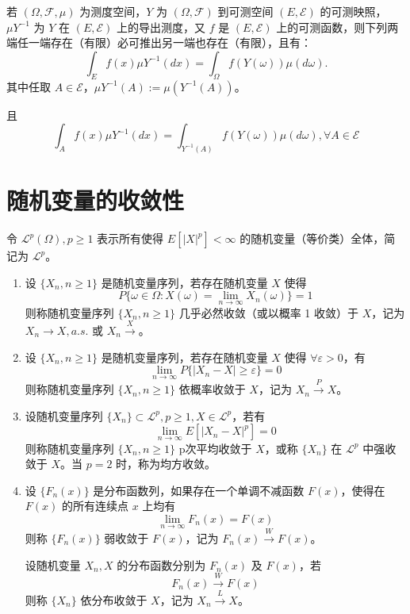 \documentclass[lang=cn,10pt,thmcnt=section]{elegantbook}
\begin{document}
\begin{theorem}[变量代换]
	若 \((\Omega, \mathscr{F}, \mu)\) 为测度空间，\(Y\) 为 \((\Omega, \mathscr{F})\) 到可测空间 \((E, \mathscr{E})\) 的可测映照，\(\mu Y^{-1}\) 为 \(Y\) 在 \((E, \mathscr{E})\) 上的导出测度，又 \(f\) 是 \((E, \mathscr{E})\) 上的可测函数，则下列两端任一端存在（有限）必可推出另一端也存在（有限），且有：
\[
\int_E f(x) \mu Y^{-1}(dx) = \int_\Omega f(Y(\omega)) \mu(d\omega). \tag{1.2.4}
\]
其中任取 \(A \in \mathscr{E}\)，\(\mu Y^{-1}(A) := \mu(Y^{-1}(A))\)。

且
\[
\int_A f(x) \mu Y^{-1}(dx) = \int_{Y^{-1}(A)} f(Y(\omega)) \mu(d\omega), \forall A \in \mathscr{E} \tag{1.2.5}
\]
\end{theorem}
\section{随机变量的收敛性}
令 \(\mathcal{L}^p(\Omega), p \geq 1\) 表示所有使得 \(E[|X|^p] < \infty\) 的随机变量（等价类）全体，简记为 \(\mathcal{L}^p\)。
\begin{definition}
	\begin{enumerate}
		\item 设 \(\{X_n, n \geq 1\}\) 是随机变量序列，若存在随机变量 \(X\) 使得
		\[
		P\{\omega \in \Omega : X(\omega) = \lim_{n \to \infty} X_n(\omega)\} = 1
		\]
		则称随机变量序列 \(\{X_n, n \geq 1\}\) 几乎必然收敛（或以概率 1 收敛）于 \(X\)，记为 \(X_n \rightarrow X, a.s.\) 或 \(X_n \xrightarrow X\)。
		\item 设 \(\{X_n, n \geq 1\}\) 是随机变量序列，若存在随机变量 \(X\) 使得 \(\forall \varepsilon > 0\)，有
		\[
		\lim_{n \to \infty} P\{|X_n - X| \geq \varepsilon\} = 0
		\]
		则称随机变量序列 \(\{X_n, n \geq 1\}\) 依概率收敛于 \(X\)，记为 \(X_n \overset{P}{\rightarrow} X\)。
		\item 设随机变量序列 \(\{X_n\} \subset \mathcal{L}^p, p \geq 1, X \in \mathcal{L}^p\)，若有
		\[
		\lim_{n \to \infty} E[|X_n - X|^p] = 0
		\]
		则称随机变量序列 \(\{X_n, n \geq 1\}\) p次平均收敛于 \(X\)，或称 \(\{X_n\}\) 在 \(\mathcal{L}^p\) 中强收敛于 \(X\)。当 \(p = 2\) 时，称为均方收敛。
		\item 设 \(\{F_n(x)\}\) 是分布函数列，如果存在一个单调不减函数 \(F(x)\)，使得在 \(F(x)\) 的所有连续点 \(x\) 上均有
		\[
		\lim_{n \to \infty} F_n(x) = F(x)
		\]
		则称 \(\{F_n(x)\}\) 弱收敛于 \(F(x)\)，记为 \(F_n(x) \overset{W}{\rightarrow} F(x)\)。
	
		设随机变量 \(X_n, X\) 的分布函数分别为 \(F_n(x)\) 及 \(F(x)\)，若
		\[
		F_n(x) \overset{W}{\rightarrow} F(x)
		\]
		则称 \(\{X_n\}\) 依分布收敛于 \(X\)，记为 \(X_n \overset{L}{\rightarrow} X\)。
	\end{enumerate}
\end{definition}
\end{document}
